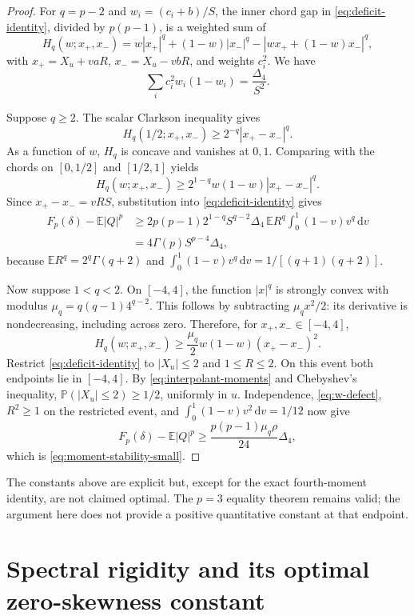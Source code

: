 \documentclass[11pt]{article}
\numberwithin{equation}{section}
\theoremstyle{definition}
\theoremstyle{remark}
\newcommand{\E}{\mathbb E}
\newcommand{\Prob}{\mathbb P}
\newcommand{\dd}{\,\mathrm d}
\newcommand{\gapfour}{\Delta_4}
\begin{document}
\begin{proof}
For $q=p-2$ and $w_i=(c_i+b)/S$, the inner chord gap in \eqref{eq:deficit-identity}, divided by $p(p-1)$, is a weighted sum of
\[
H_q(w;x_+,x_-)
=w|x_+|^q+(1-w)|x_-|^q
-|wx_++(1-w)x_-|^q,
\]
with $x_+=X_u+vaR$, $x_-=X_u-vbR$, and weights $c_i^2$. We have
\begin{equation}\label{eq:w-defect}
\sum_i c_i^2w_i(1-w_i)=\frac{\gapfour}{S^2}.
\end{equation}

Suppose $q\geq2$. The scalar Clarkson inequality gives
\[
H_q(1/2;x_+,x_-)\geq2^{-q}|x_+-x_-|^q.
\]
As a function of $w$, $H_q$ is concave and vanishes at $0,1$. Comparing with the chords on $[0,1/2]$ and $[1/2,1]$ yields
\begin{equation}\label{eq:power-gap}
H_q(w;x_+,x_-)
\geq2^{1-q}w(1-w)|x_+-x_-|^q.
\end{equation}
Since $x_+-x_-=vRS$, substitution into \eqref{eq:deficit-identity} gives
\begin{align*}
F_p(\delta)-\E|Q|^p
&\geq2p(p-1)2^{1-q}S^{q-2}\gapfour\,
\E R^q\int_0^1(1-v)v^q\dd v\\
&=4\Gamma(p)S^{p-4}\gapfour,
\end{align*}
because $\E R^q=2^q\Gamma(q+2)$ and
$\int_0^1(1-v)v^q\dd v=1/[(q+1)(q+2)]$.

Now suppose $1<q<2$. On $[-4,4]$, the function $|x|^q$ is strongly convex with modulus
$\mu_q=q(q-1)4^{q-2}$. This follows by subtracting $\mu_q x^2/2$: its derivative is nondecreasing, including across zero. Therefore, for $x_+,x_-\in[-4,4]$,
\[
H_q(w;x_+,x_-)\geq\frac{\mu_q}{2}w(1-w)(x_+-x_-)^2.
\]
Restrict \eqref{eq:deficit-identity} to $|X_u|\leq2$ and $1\leq R\leq2$. On this event both endpoints lie in $[-4,4]$. By \eqref{eq:interpolant-moments} and Chebyshev's inequality,
$\Prob(|X_u|\leq2)\geq1/2$, uniformly in $u$. Independence, \eqref{eq:w-defect}, $R^2\geq1$ on the restricted event, and
$\int_0^1(1-v)v^2\dd v=1/12$ now give
\[
F_p(\delta)-\E|Q|^p
\geq\frac{p(p-1)\mu_q\rho}{24}\gapfour,
\]
which is \eqref{eq:moment-stability-small}.
\end{proof}

The constants above are explicit but, except for the exact fourth-moment identity, are not claimed optimal. The $p=3$ equality theorem remains valid; the argument here does not provide a positive quantitative constant at that endpoint.

\section{Spectral rigidity and its optimal zero-skewness constant}
\label{sec:rigidity}
\end{document}
